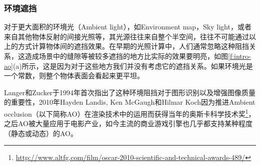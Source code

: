\subsubsection{环境遮挡}
对于更大面积的环境光（Ambient light），如Environment map，Sky light，或者来自其他物体反射的间接光照等，其光源往往来自整个半空间，往往不可能通过以上的方式计算物体间的遮挡效果。在早期的光照计算中，人们通常忽略这种阻挡关系，这造成场景中的缝隙等被较多遮挡的地方比实际的效果要明亮，如图\ref{f:intro-ao}(a)所示，这是因为对于这些地方我们并没有考虑它的遮挡关系。如果环境光是一个常数，则整个物体表面会看起来更平坦。

Langer和Zucker\cite{a:Shape-from-shadingonacloudyday}于1994年首次指出了这种环境阻挡对于图形识别以及增强图像质量的重要性，2010年Hayden Landis, Ken McGaugh和Hilmar Koch因为推进Ambient occlusion（以下简称AO）在渲染技术中的运用而获得当年的奥斯卡科学技术奖\footnote{\url{http://www.altfg.com/film/oscar-2010-scientific-and-technical-awards-489/}}，之后AO被大量应用于电影产业，如今主流的商业游戏引擎也几乎都支持某种程度（静态或动态）的AO。

